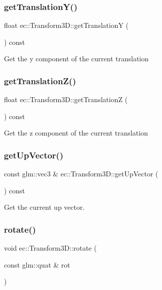 \subsubsection{\texorpdfstring{get\+Translation\+Y()}{getTranslationY()}}
{\footnotesize\ttfamily float ec\+::\+Transform3\+D\+::get\+TranslationY (\begin{DoxyParamCaption}{ }\end{DoxyParamCaption}) const}

Get the y component of the current translation \mbox{\label{classec_1_1_transform3_d_a5d7ec019acf68cb930db1a7db79ef97f}} 
\subsubsection{\texorpdfstring{get\+Translation\+Z()}{getTranslationZ()}}
{\footnotesize\ttfamily float ec\+::\+Transform3\+D\+::get\+TranslationZ (\begin{DoxyParamCaption}{ }\end{DoxyParamCaption}) const}

Get the z component of the current translation \mbox{\label{classec_1_1_transform3_d_af8bdfb3bbc688a9a920ccb4d452d8962}} 
\subsubsection{\texorpdfstring{get\+Up\+Vector()}{getUpVector()}}
{\footnotesize\ttfamily const glm\+::vec3 \& ec\+::\+Transform3\+D\+::get\+Up\+Vector (\begin{DoxyParamCaption}{ }\end{DoxyParamCaption}) const}



Get the current up vector. 

\mbox{\label{classec_1_1_transform3_d_a24885ce6a9f002a00f7c263e4076ea6b}} 
\subsubsection{\texorpdfstring{rotate()}{rotate()}\hspace{0.1cm}{\footnotesize\ttfamily [1/2]}}
{\footnotesize\ttfamily void ec\+::\+Transform3\+D\+::rotate (\begin{DoxyParamCaption}\item[{const glm\+::quat \&}]{rot }\end{DoxyParamCaption})}

